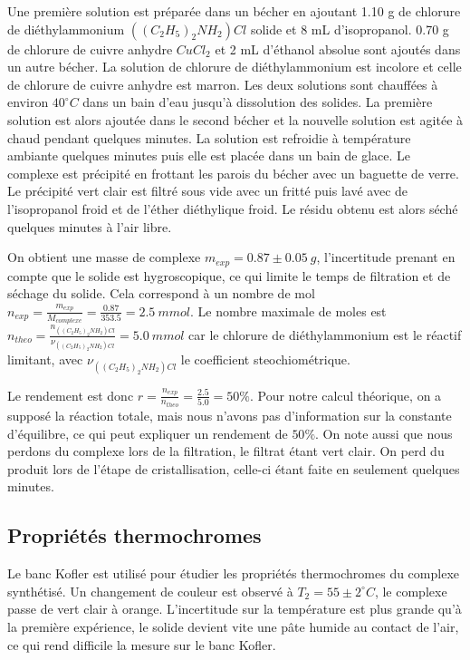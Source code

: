 \documentclass[12pt]{article}
\begin{document}
Une première solution est préparée dans un bécher en ajoutant 1.10 g de chlorure de diéthylammonium $((C_2H_5)_2NH_2)Cl$ solide et 8 mL d'isopropanol.
0.70 g de chlorure de cuivre anhydre $CuCl_2$ et 2 mL d'éthanol absolue sont ajoutés dans un autre bécher. La solution de chlorure de diéthylammonium est incolore et celle de chlorure de cuivre anhydre est marron.
Les deux solutions sont chauffées à environ $40 ^\circ C$ dans un bain d'eau jusqu'à dissolution des solides.
La première solution est alors ajoutée dans le second bécher et la nouvelle solution est agitée à chaud pendant quelques minutes.
La solution est refroidie à température ambiante quelques minutes puis elle est placée dans un bain de glace.
Le complexe est précipité en frottant les parois du bécher avec un baguette de verre.
Le précipité vert clair est filtré sous vide avec un fritté puis lavé avec de l'isopropanol froid et de l'éther diéthylique froid.
Le résidu obtenu est alors séché quelques minutes à l'air libre. 

On obtient une masse de complexe $m_{exp}=0.87 \pm 0.05\ g$, l'incertitude prenant en compte que le solide est hygroscopique, ce qui limite le temps de filtration et de séchage du solide.
Cela correspond à un nombre de mol $n_{exp}=\frac{m_{exp}}{M_{complexe}}=\frac{0.87}{353.5}= 2.5 \ mmol$. 
Le nombre maximale de moles est $n_{theo}=\frac{n_{((C_2H_5)_2NH_2)Cl}}{\nu_{((C_2H_5)_2NH_2)Cl}}=5.0 \ mmol$ car le chlorure de diéthylammonium est le réactif limitant, avec $\nu_{((C_2H_5)_2NH_2)Cl}$ le coefficient steochiométrique.

Le rendement est donc $r=\frac{n_{exp}}{n_{theo}}=\frac{2.5}{5.0}=50 \%$. 
Pour notre calcul théorique, on a supposé la réaction totale, mais nous n'avons pas d'information sur la constante d'équilibre, ce qui peut expliquer un rendement de $50 \%$.
On note aussi que nous perdons du complexe lors de la filtration, le filtrat étant vert clair.
On perd du produit lors de l'étape de cristallisation, celle-ci étant faite en seulement quelques minutes.


\subsection{Propriétés thermochromes}

Le banc Kofler est utilisé pour étudier les propriétés thermochromes du complexe synthétisé. 
Un changement de couleur est observé à $T_2=55 \pm 2 ^\circ C$, le complexe passe de vert clair à orange. 
L'incertitude sur la température est plus grande qu'à la première expérience, le solide devient vite une pâte humide au contact de l'air, ce qui rend difficile la mesure sur le banc Kofler.
\end{document}
